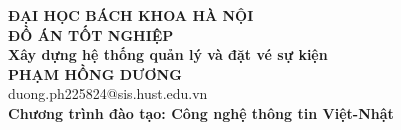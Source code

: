 \documentclass[DoAn.tex]{subfiles}
\begin{document}
\begin{titlepage}
\thispagestyle{empty}
\begin{center}

{\textbf{\large{ĐẠI HỌC BÁCH KHOA HÀ NỘI}}}\\[3.2cm]

{\textbf{\huge{ ĐỒ ÁN TỐT NGHIỆP}}}\\[1cm]
{\textbf{\Large{Xây dựng hệ thống quản lý và đặt vé sự kiện}}\\[1cm]

{\textbf{\large{PHẠM HỒNG DƯƠNG}}}\\
{\large{duong.ph225824@sis.hust.edu.vn}}\\[0.5cm]

{\textbf{\large{Chương trình đào tạo: Công nghệ thông tin Việt-Nhật
}}}\\

\vspace{2.6cm}
}
\end{center}



\end{titlepage}
\end{document}
